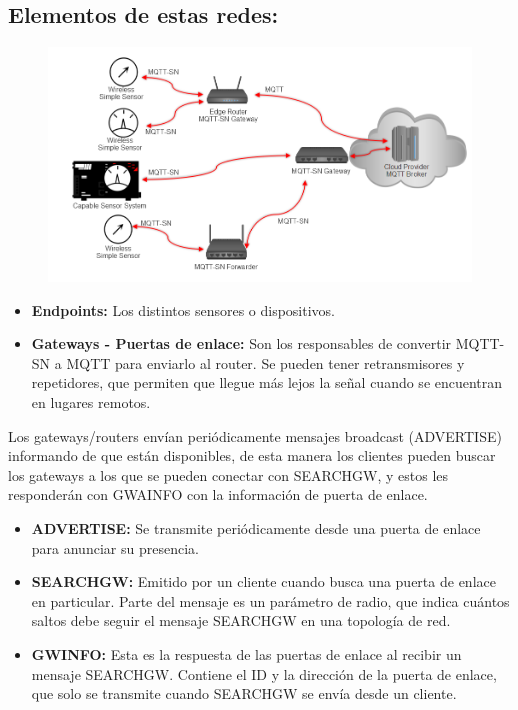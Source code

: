\documentclass[12pt, twoside, openright]{report} %
\begin{document}
\subsection{Elementos de estas redes:}
\begin{figure}[H]
	{\includegraphics[scale=.35]{15a80880-30ad-472a-bf98-254556798207.png}}
\end{figure}
\begin{itemize}
	\item \textbf{Endpoints:} Los distintos sensores o dispositivos.
	\item \textbf{Gateways - Puertas de enlace:} Son los responsables de convertir MQTT-SN a MQTT para enviarlo al router. Se pueden tener retransmisores y repetidores, que permiten que llegue más lejos la señal cuando se encuentran en lugares remotos.
\end{itemize}

Los gateways/routers envían periódicamente mensajes broadcast (ADVERTISE) informando de que están disponibles, de esta manera los clientes pueden buscar los gateways a los que se pueden conectar con SEARCHGW, y estos les responderán con GWAINFO con la información de puerta de enlace.
\begin{itemize}
	\item \textbf{ADVERTISE:} Se transmite periódicamente desde una puerta de enlace para anunciar su presencia.
	\item \textbf{SEARCHGW:} Emitido por un cliente cuando busca una puerta de enlace en particular. Parte del mensaje es un parámetro de radio, que indica cuántos saltos debe seguir el mensaje SEARCHGW en una topología de red.
	\item \textbf{GWINFO:} Esta es la respuesta de las puertas de enlace al recibir un mensaje SEARCHGW. Contiene el ID y la dirección de la puerta de enlace, que solo se transmite cuando SEARCHGW se envía desde un cliente.
\end{itemize}
\end{document}
